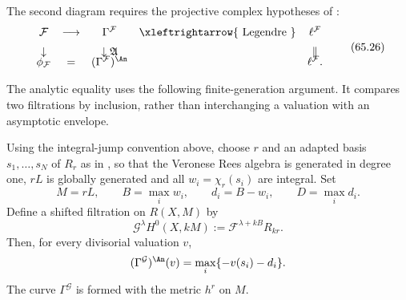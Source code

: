 The second diagram requires the projective complex hypotheses of
:
\[
\begin{array}{ccccc}
\mathcal F
&\longrightarrow&
\Gamma^{\mathcal F}
&\xleftrightarrow{\ \mathrm{Legendre}\ }&
\ell^{\mathcal F}
\\[2mm]
\downarrow&&\downarrow\mathfrak A&&\Vert
\\[-1mm]
\phi_{\mathcal F}
&=&
(\Gamma^{\mathcal F})^{\An}
&&\ell^{\mathcal F}.
\end{array}
\tag{65.26}\label{eq:rf-analytic-square}
\]

The analytic equality uses the following finite-generation argument. It compares two filtrations by inclusion, rather than interchanging a valuation with an asymptotic envelope.

\noindent\begin{minipage}{\linewidth}
\begin{lemma}\label{lem:rf-flag-analytification}
Using the integral-jump convention above, choose $r$ and an adapted basis $s_1,\ldots,s_N$ of $R_r$ as in , so that the Veronese Rees algebra is generated in degree one, $rL$ is globally generated and all $w_i=\chi_r(s_i)$ are integral. Set
\[
 M=rL,\qquad B=\max_i w_i,\qquad d_i=B-w_i,\qquad D=\max_i d_i.
\]
Define a shifted filtration on $R(X,M)$ by
\[
       \mathcal G^\lambda H^0(X,kM)
           :=\mathcal F^{\lambda+kB}R_{kr}.
\]
Then, for every divisorial valuation $v$,
\[
       (\Gamma^{\mathcal G})^{\An}(v)
            =\max_i\{-v(s_i)-d_i\}.
\]
The curve $\Gamma^{\mathcal G}$ is formed with the metric $h^r$ on $M$.
\end{lemma}
\end{minipage}\par

